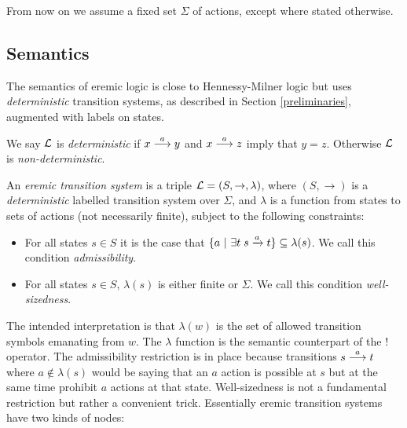\begin{convention}
From now on we assume a fixed set $\Sigma$ of actions, except where
stated otherwise.
\end{convention}

\subsection{Semantics}

\NI The semantics of eremic logic is close to Hennessy-Milner logic
\cite{HennessyM:alglawfndac} but uses \emph{deterministic} transition systems, as
described in Section \ref{preliminaries}, augmented with labels on
states.

\begin{definition}

\NI We say $\mathcal{L}$ is \emph{deterministic} if $x \stackrel{a}{\longrightarrow} y$ and $x \stackrel{a}{\longrightarrow} z$ imply that $y = z$. Otherwise $\mathcal{L}$ is
\emph{non-deterministic}.
\end{definition}

An \emph{eremic transition system} is a triple $\mathcal{L} = (S, \rightarrow,
\lambda)$, where $(S, \rightarrow)$ is a \emph{deterministic} labelled transition system
over $\Sigma$, and $\lambda$ is a function from states to sets of
actions (not necessarily finite), subject to the following constraints:
\begin{itemize}

\item For all states $s \in S$ it is the case that $ \{a \ | \  \exists
  t \; s \xrightarrow{a} t\} \subseteq \lambda(s)$. We call this
  condition \emph{admissibility}.

\item For all states $s \in S$, $\lambda (s)$ is either finite or
  $\Sigma$. We call this condition \emph{well-sizedness}.

\end{itemize}

\NI The intended interpretation is that $\lambda(w)$ is the set of
allowed transition symbols emanating from $w$.  The $\lambda$ function
is the semantic counterpart of the $!$ operator.  The admissibility
restriction is in place because transitions $s \stackrel{a}{\longrightarrow} t$ where $a
\notin \lambda(s)$ would be saying that an $a$ action is possible at
$s$ but at the same time prohibit $a$ actions at that state.
Well-sizedness is not a fundamental restriction but rather a
convenient trick. Essentially eremic transition systems have two kinds
of nodes:

